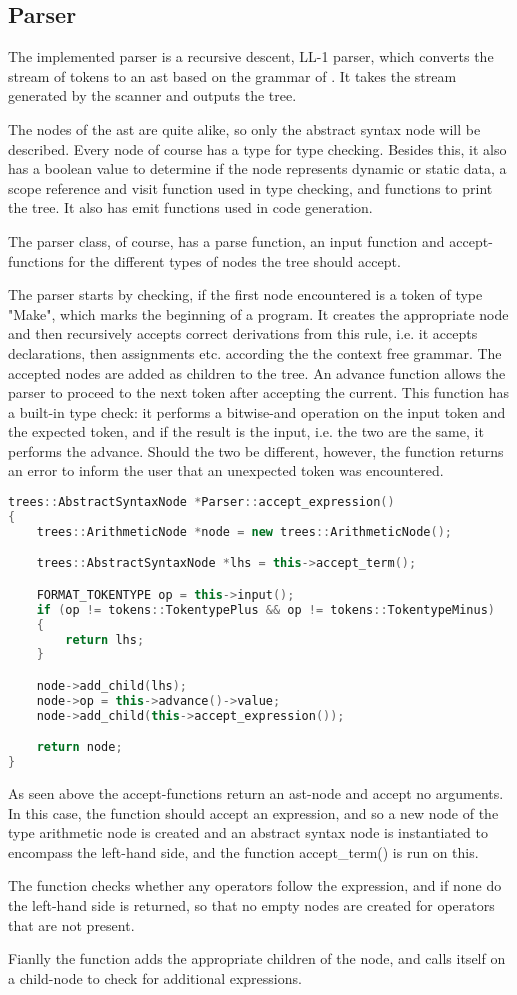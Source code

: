 \subsection{Parser}
The implemented parser is a recursive descent, LL-1 parser, which converts the stream of tokens to an \ac{ast} based on the grammar of \langname{}. It takes the stream generated by the scanner and outputs the tree.

The nodes of the \ac{ast} are quite alike, so only the abstract syntax node will be described. Every node of course has a type for type checking. Besides this, it also has a boolean value to determine if the node represents dynamic or static data, a scope reference and visit function used in type checking, and functions to print the tree. It also has emit functions used in code generation.
 
The parser class, of course, has a parse function, an input function and accept-functions for the different types of nodes the tree should accept.

The parser starts by checking, if the first node encountered is a token of type "Make", which marks the beginning of a program. It creates the appropriate node and then recursively accepts correct derivations from this rule, i.e. it accepts declarations, then assignments etc. according the the context free grammar. The accepted nodes are added as children to the tree. An advance function allows the parser to proceed to the next token after accepting the current. This function has a built-in type check: it performs a bitwise-and operation on the input token and the expected token, and if the result is the input, i.e. the two are the same, it performs the advance. Should the two be different, however, the function returns an error to inform the user that an unexpected token was encountered.

\begin{lstlisting}[language = c++]
trees::AbstractSyntaxNode *Parser::accept_expression()
{
	trees::ArithmeticNode *node = new trees::ArithmeticNode();

	trees::AbstractSyntaxNode *lhs = this->accept_term();

	FORMAT_TOKENTYPE op = this->input();
	if (op != tokens::TokentypePlus && op != tokens::TokentypeMinus)
	{
		return lhs;
	}

	node->add_child(lhs);
	node->op = this->advance()->value;
	node->add_child(this->accept_expression());

	return node;
}
\end{lstlisting}

As seen above the accept-functions return an \ac{ast}-node and accept no arguments. In this case, the function should accept an expression, and so a new node of the type arithmetic node is created and an abstract syntax node is instantiated to encompass the left-hand side, and the function accept_term() is run on this. 

The function checks whether any operators follow the expression, and if none do the left-hand side is returned, so that no empty nodes are created for operators that are not present.

Fianlly the function adds the appropriate children of the node, and calls itself on a child-node to check for additional expressions.

